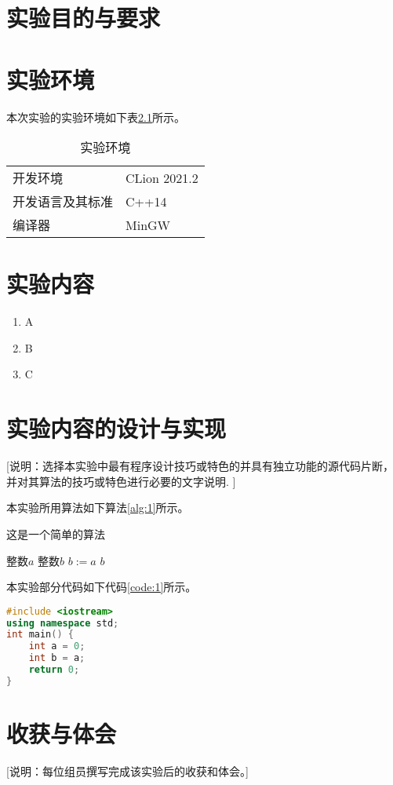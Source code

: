 \chapter{实验目的与要求}

\chapter{实验环境}

本次实验的实验环境如下表\ref{tab:env}所示。

\begin{table}[!htbp]
    \centering
    \caption{实验环境}
    \label{tab:env}
    \begin{tabular}{ll}
    \toprule[1pt]  
    开发环境       & CLion 2021.2  \\
    开发语言及其标准    & C++14         \\
    编译器         & MinGW          \\
    \bottomrule[1pt]
    \end{tabular}
\end{table}

\chapter{实验内容}

\begin{enumerate}
    \item A
    \item B
    \item C
\end{enumerate}


\chapter{实验内容的设计与实现}

[说明：选择本实验中最有程序设计技巧或特色的并具有独立功能的源代码片断，并对其算法的技巧或特色进行必要的文字说明. ]

本实验所用算法如下算法\ref{alg:1}所示。

\begin{algorithm}
    \caption{这是一个简单的算法}
    \label{alg:1}
    \begin{algorithmic}[1]
        \REQUIRE    整数$a$
        \ENSURE     整数$b$
        \STATE      $b := a$
        \RETURN     $b$
    \end{algorithmic}
\end{algorithm}

本实验部分代码如下代码\ref{code:1}所示。

\begin{lstlisting}[language = C++, caption = {这是一段简单的代码}, label = {code:1}]
#include <iostream>
using namespace std;
int main() {
    int a = 0;
    int b = a;
    return 0;
}
\end{lstlisting}

\chapter{收获与体会}

[说明：每位组员撰写完成该实验后的收获和体会。]